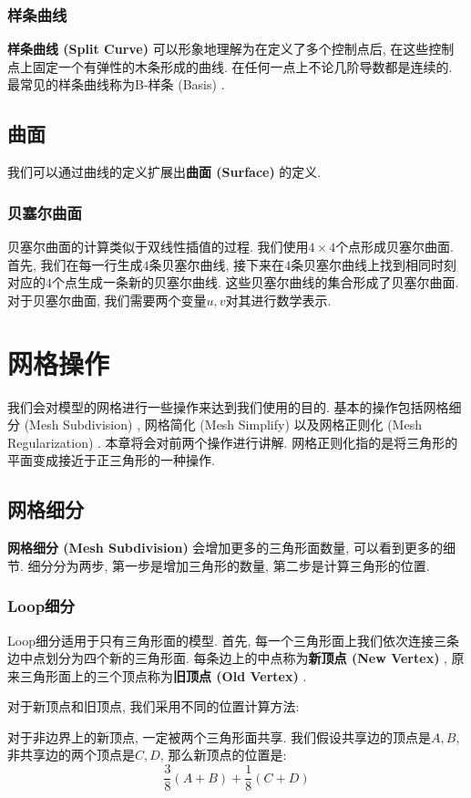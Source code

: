 \subsection{样条曲线}
\textbf{样条曲线 (Split Curve) }可以形象地理解为在定义了多个控制点后, 在这些控制点上固定一个有弹性的木条形成的曲线. 在任何一点上不论几阶导数都是连续的. 最常见的样条曲线称为B-样条 (Basis) . 

\section{曲面}
我们可以通过曲线的定义扩展出\textbf{曲面 (Surface) }的定义. 

\subsection{贝塞尔曲面}
贝塞尔曲面的计算类似于双线性插值的过程. 我们使用$4\times 4$个点形成贝塞尔曲面. 首先, 我们在每一行生成$4$条贝塞尔曲线, 接下来在$4$条贝塞尔曲线上找到相同时刻对应的$4$个点生成一条新的贝塞尔曲线. 这些贝塞尔曲线的集合形成了贝塞尔曲面. 对于贝塞尔曲面, 我们需要两个变量$u,v$对其进行数学表示. 

\chapter{网格操作}
我们会对模型的网格进行一些操作来达到我们使用的目的. 基本的操作包括网格细分 (Mesh Subdivision) , 网格简化 (Mesh Simplify) 以及网格正则化 (Mesh Regularization) . 本章将会对前两个操作进行讲解. 网格正则化指的是将三角形的平面变成接近于正三角形的一种操作. 

\section{网格细分}
\textbf{网格细分 (Mesh Subdivision) }会增加更多的三角形面数量, 可以看到更多的细节. 细分分为两步, 第一步是增加三角形的数量, 第二步是计算三角形的位置. 

\subsection{Loop细分}
Loop细分适用于只有三角形面的模型. 首先, 每一个三角形面上我们依次连接三条边中点划分为四个新的三角形面. 每条边上的中点称为\textbf{新顶点 (New Vertex) }, 原来三角形面上的三个顶点称为\textbf{旧顶点 (Old Vertex) }. 

对于新顶点和旧顶点, 我们采用不同的位置计算方法: 

对于非边界上的新顶点, 一定被两个三角形面共享. 我们假设共享边的顶点是$A,B$, 非共享边的两个顶点是$C,D$, 那么新顶点的位置是: 
\begin{equation}
	\frac{3}{8}(A+B)+\frac{1}{8}(C+D)
\end{equation}

